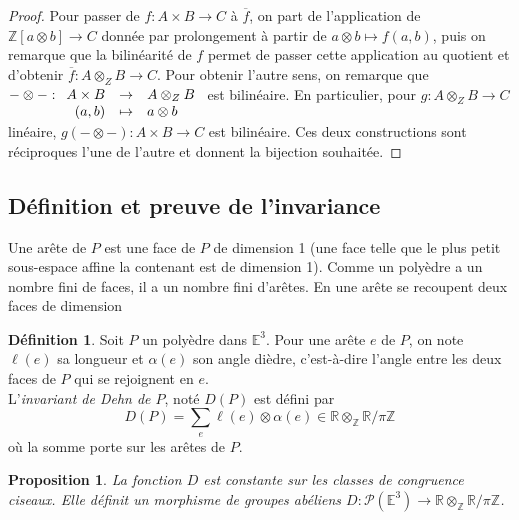 \documentclass{article}
\newcommand{\Z}{\mathbb{Z}}
\newcommand{\R}{\mathbb{R}}
\newcommand{\E}{\mathbb{E}}
\renewcommand{\P}{\mathcal{P}}
\newcommand{\applic}[4]{\begin{array}[t]{rcl}
#1 & \to & #2 \\
#3 & \mapsto & #4
\end{array}}
\theoremstyle{plain}
\newtheorem{proposition}[theorem]{Proposition}
\theoremstyle{definition}
\newtheorem{definition}[theorem]{Définition}
\theoremstyle{remark}
\begin{document}
\begin{proof}
    Pour passer de $f : A \times B \to C$ à $\overline{f}$, on part de l'application de $\Z[a\otimes b] \to C$ donnée par prolongement à partir de $a\otimes b \mapsto f(a,b)$, puis on remarque que la bilinéarité de $f$ permet de passer cette application au quotient et d'obtenir $\overline{f} : A\otimes_Z B \to C$. Pour obtenir l'autre sens, on remarque que $- \otimes- : \applic{A\times B}{A\otimes_Z B}{(a,b)}{a \otimes b}$ est bilinéaire. En particulier, pour $g : A \otimes_Z B \to C$ linéaire, $g (- \otimes -) : A \times B \to C$ est bilinéaire. Ces deux constructions sont réciproques l'une de l'autre et donnent la bijection souhaitée.
\end{proof}

\subsection{Définition et preuve de l'invariance}

Une arête de $P$ est une face de $P$ de dimension 1 (une face telle que le plus petit sous-espace affine la contenant est de dimension 1). Comme un polyèdre a un nombre fini de faces, il a un nombre fini d'arêtes. En une arête se recoupent deux faces de dimension 

\begin{definition}
    Soit $P$ un polyèdre dans $\E^3$. Pour une arête $e$ de $P$, on note $\ell(e)$ sa longueur et $\alpha(e)$ son angle dièdre, c'est-à-dire l'angle entre les deux faces de $P$ qui se rejoignent en $e$. \\
    L'\emph{invariant de Dehn de $P$}, noté $D(P)$ est défini par
    \[D(P) = \sum_e \ell(e) \otimes \alpha(e) \in \R \otimes_\Z \R/\pi\Z\]
    où la somme porte sur les arêtes de $P$.
\end{definition}

\begin{proposition}
    La fonction $D$ est constante sur les classes de congruence ciseaux. Elle définit un morphisme de groupes abéliens $D : \P(\E^3) \to \R \otimes_\Z \R/\pi \Z$.
\end{proposition}
\end{document}
